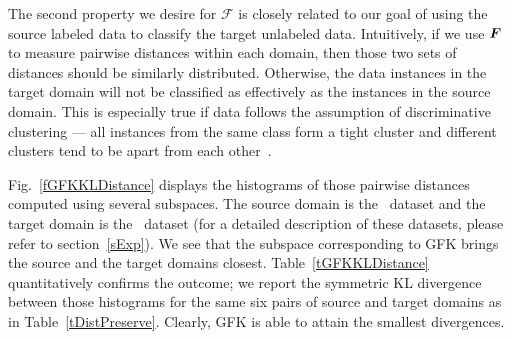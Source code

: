 {The second property we desire for $\mathcal{F}$ is closely related to our goal of using the source labeled data to classify the target unlabeled data. Intuitively, if we use $\boldsymbol{F}$ to  measure pairwise distances within each domain, then those two sets of distances should be similarly distributed. Otherwise, the data instances in the target domain will not be classified as effectively as the instances in the source domain. This is especially true if data follows the assumption of discriminative clustering --- all instances from the same class form a tight cluster and different clusters tend to be apart from each other~\cite{shi2012}.

Fig.~\ref{fGFKKLDistance} displays the histograms of those pairwise distances computed using several subspaces.   The source domain is the \amazon\ dataset and the target domain is the \webcam\ dataset (for a detailed description of these datasets, please refer to section~\ref{sExp}). We see that the subspace corresponding to GFK brings the source and the target domains closest.  Table~\ref{tGFKKLDistance} quantitatively confirms the outcome; we report the symmetric KL divergence between those histograms for the same six pairs of source and target domains as in Table~\ref{tDistPreserve}. Clearly, GFK is able to attain the smallest divergences.

}
